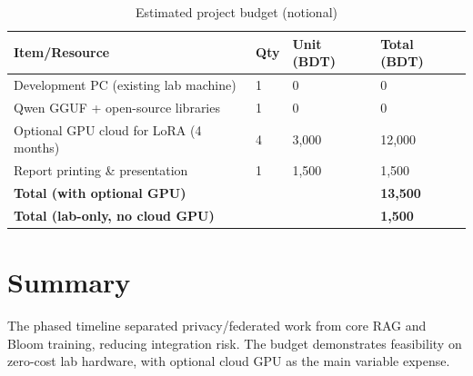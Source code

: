 \begin{table}[H]
\centering
\caption{Estimated project budget (notional)}
\label{tab:project_budget}
\renewcommand{\arraystretch}{1.2}
\begin{tabular}{|p{}|p{}|p{}|p{}|}
\hline
\textbf{Item/Resource} & \textbf{Qty} & \textbf{Unit (BDT)} & \textbf{Total (BDT)} \\
\hline
Development PC (existing lab machine) & 1 & 0 & 0 \\
\hline
Qwen GGUF + open-source libraries & 1 & 0 & 0 \\
\hline
Optional GPU cloud for LoRA (4 months) & 4 & 3,000 & 12,000 \\
\hline
Report printing \& presentation & 1 & 1,500 & 1,500 \\
\hline
\textbf{Total (with optional GPU)} & & & \textbf{13,500} \\
\hline
\textbf{Total (lab-only, no cloud GPU)} & & & \textbf{1,500} \\
\hline
\end{tabular}
\end{table}

\section{Summary}
The phased timeline separated privacy/federated work from core RAG and Bloom training, reducing integration risk. The budget demonstrates feasibility on zero-cost lab hardware, with optional cloud GPU as the main variable expense.
